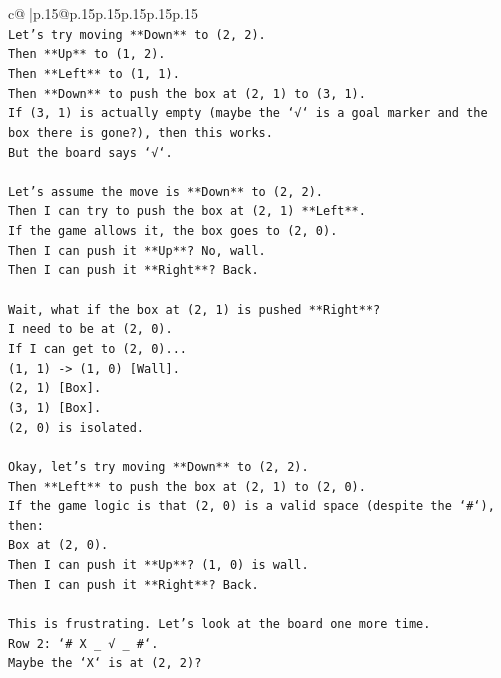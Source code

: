 \documentclass{article}
\begin{document}
{\begin{supertabular}{c@{$\;$}|p{.15\linewidth}@{}p{.15\linewidth}p{.15\linewidth}p{.15\linewidth}p{.15\linewidth}p{.15\linewidth}}
{{{\\ 
\texttt{Let's try moving **Down** to (2, 2).} \\
\texttt{Then **Up** to (1, 2).} \\
\texttt{Then **Left** to (1, 1).} \\
\texttt{Then **Down** to push the box at (2, 1) to (3, 1).} \\
\texttt{If (3, 1) is actually empty (maybe the `√` is a goal marker and the box there is gone?), then this works.} \\
\texttt{But the board says `√`.} \\
\\ 
\texttt{Let's assume the move is **Down** to (2, 2).} \\
\texttt{Then I can try to push the box at (2, 1) **Left**.} \\
\texttt{If the game allows it, the box goes to (2, 0).} \\
\texttt{Then I can push it **Up**? No, wall.} \\
\texttt{Then I can push it **Right**? Back.} \\
\\ 
\texttt{Wait, what if the box at (2, 1) is pushed **Right**?} \\
\texttt{I need to be at (2, 0).} \\
\texttt{If I can get to (2, 0)...} \\
\texttt{(1, 1) {-}> (1, 0) {[}Wall{]}.} \\
\texttt{(2, 1) {[}Box{]}.} \\
\texttt{(3, 1) {[}Box{]}.} \\
\texttt{(2, 0) is isolated.} \\
\\ 
\texttt{Okay, let's try moving **Down** to (2, 2).} \\
\texttt{Then **Left** to push the box at (2, 1) to (2, 0).} \\
\texttt{If the game logic is that (2, 0) is a valid space (despite the `\#`), then:} \\
\texttt{Box at (2, 0).} \\
\texttt{Then I can push it **Up**? (1, 0) is wall.} \\
\texttt{Then I can push it **Right**? Back.} \\
\\ 
\texttt{This is frustrating. Let's look at the board one more time.} \\
\texttt{Row 2: `\# X \_ √ \_ \#`.} \\
\texttt{Maybe the `X` is at (2, 2)?} \\
}}}
\end{supertabular}}
\end{document}
